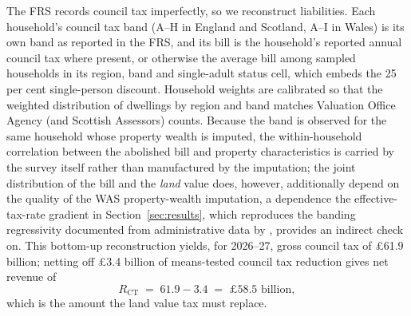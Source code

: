The FRS records council tax imperfectly, so we reconstruct liabilities. Each household's council tax band (A--H in England and Scotland, A--I in Wales) is its own band as reported in the FRS, and its bill is the household's reported annual council tax where present, or otherwise the average bill among sampled households in its region, band and single-adult status cell, which embeds the 25 per cent single-person discount. Household weights are calibrated so that the weighted distribution of dwellings by region and band matches Valuation Office Agency (and Scottish Assessors) counts. Because the band is observed for the same household whose property wealth is imputed, the within-household correlation between the abolished bill and property characteristics is carried by the survey itself rather than manufactured by the imputation; the joint distribution of the bill and the \emph{land} value does, however, additionally depend on the quality of the WAS property-wealth imputation, a dependence the effective-tax-rate gradient in Section~\ref{sec:results}, which reproduces the banding regressivity documented from administrative data by \citet{adam2020}, provides an indirect check on. This bottom-up reconstruction yields, for 2026--27, gross council tax of \pounds 61.9 billion; netting off \pounds 3.4 billion of means-tested council tax reduction gives net revenue of
\begin{equation}
R_{\mathrm{CT}} \;=\; 61.9 - 3.4 \;=\; \pounds 58.5 \text{ billion},
\label{eq:ctrev}
\end{equation}
which is the amount the land value tax must replace.


